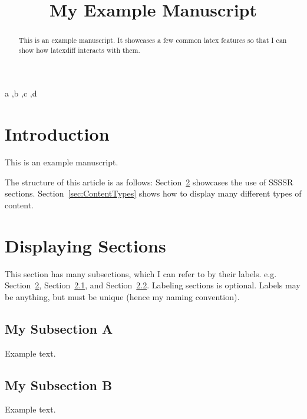 \documentclass[preprint,3p,11pt,sort]{elsarticle}
\newcommand{\secref}[1]{Section~\ref{#1}}
\begin{document}
\begin{frontmatter}

\title{My Example Manuscript}


\begin{abstract}
    This is an example manuscript. It showcases a few common latex features so that I can show how latexdiff interacts with them.
\end{abstract}

\begin{keyword}
    a \sep b \sep c \sep d
\end{keyword}

\end{frontmatter}

\section{Introduction} \label{sec:intro}
This is an example manuscript.

The structure of this article is as follows: \secref{sec:mySection} showcases the use of SSSSR sections. \secref{sec:ContentTypes} shows how to display many different types of content.


\section{Displaying Sections} \label{sec:mySection}
This section has many subsections, which I can refer to by their labels. e.g. \secref{sec:mySection}, \secref{ssec:mySubsectionA}, and \secref{ssec:mySubsectionB}. Labeling sections is optional. Labels may be anything, but must be unique (hence my naming convention).

\subsection{My Subsection A} \label{ssec:mySubsectionA}
Example text.


\subsection{My Subsection B} \label{ssec:mySubsectionB}
Example text.
\end{document}
